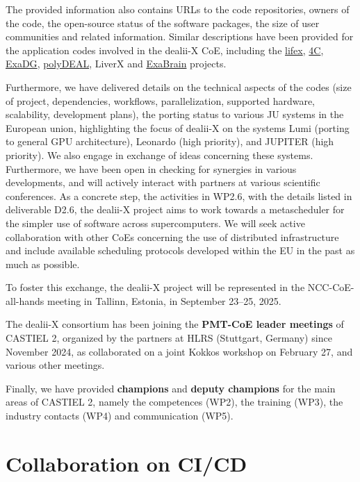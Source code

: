 \documentclass[a4paper,12pt]{article}
\begin{document}
The provided information also contains URLs to the code repositories, owners
of the code, the open-source status of the software packages, the size of user
communities and related information. Similar descriptions have been provided
for the application codes involved in the dealii-X CoE, including the
\href{https://lifex.gitlab.io/}{lifex},
\href{https://github.com/4C-multiphysics/4C}{4C},
\href{https://github.com/exadg/exadg}{ExaDG},
\href{https://github.com/fdrmrc/Polydeal}{polyDEAL}, LiverX and
\href{https://github.com/BRAINIACS-Group/ExaBrain}{ExaBrain} projects.

Furthermore, we have delivered details on the technical aspects of the codes
(size of project, dependencies, workflows, parallelization, supported
hardware, scalability, development plans), the porting status to various JU
systems in the European union, highlighting the focus of dealii-X on the
systems Lumi (porting to general GPU architecture), Leonardo (high priority),
and JUPITER (high priority). We also engage in exchange of ideas concerning
these systems. Furthermore, we have been open in checking for synergies in
various developments, and will actively interact with partners at various
scientific conferences. As a concrete step, the activities in WP2.6, with the
details listed in deliverable D2.6, the dealii-X project aims to work towards
a metascheduler for the simpler use of software across supercomputers. We will
seek active collaboration with other CoEs concerning the use of distributed
infrastructure and include available scheduling protocols developed within the
EU in the past as much as possible.

To foster this exchange, the dealii-X project will be represented in the
NCC-CoE-all-hands meeting in Tallinn, Estonia, in September 23--25, 2025.

The dealii-X consortium has been joining the \textbf{PMT-CoE leader meetings}
of CASTIEL 2, organized by the partners at HLRS (Stuttgart, Germany) since
November 2024, as collaborated on a joint Kokkos workshop on February 27, and
various other meetings.

Finally, we have provided \textbf{champions} and \textbf{deputy champions} for
the main areas of CASTIEL 2, namely the competences (WP2), the training (WP3),
the industry contacts (WP4) and communication (WP5).

\section{Collaboration on CI/CD}
\end{document}
